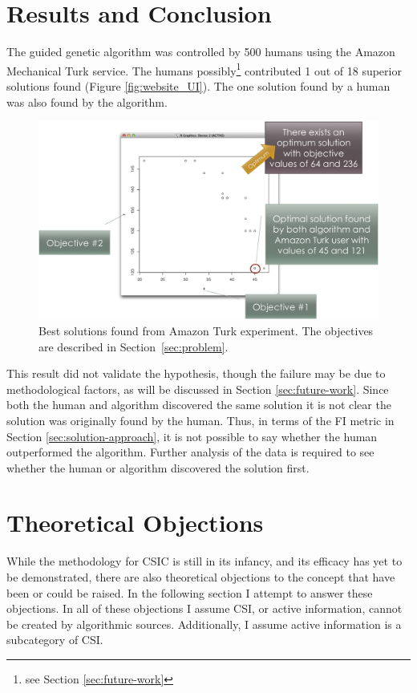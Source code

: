 \section{Results and Conclusion}
The guided genetic algorithm was controlled by 500 humans using the Amazon Mechanical Turk service.  The humans possibly\footnote{see Section \ref{sec:future-work}} contributed 1 out of 18 superior solutions found (Figure \ref{fig:website_UI}).  The one solution found by a human was also found by the algorithm.

\begin{figure}[!t]
  \centering
  \includegraphics[width=4.5in]{HollowayResults}
  \caption{Best solutions found from Amazon Turk experiment.  The objectives are described in Section~\ref{sec:problem}.}
  \label{fig:results}
\end{figure}

This result did not validate the hypothesis, though the failure may be due to methodological factors, as will be discussed in Section \ref{sec:future-work}.  Since both the human and algorithm discovered the same solution it is not clear the solution was originally found by the human.  Thus, in terms of the FI metric in Section \ref{sec:solution-approach}, it is not possible to say whether the human outperformed the algorithm.  Further analysis of the data is required to see whether the human or algorithm discovered the solution first.

\section{Theoretical Objections}\label{sec:objections}

While the methodology for CSIC is still in its infancy, and its efficacy has yet to be demonstrated, there are also theoretical objections to the concept that have been or could be raised.  In the following section I attempt to answer these objections.  In all of these objections I assume CSI, or active information, cannot be created by algorithmic sources.  Additionally, I assume active information is a subcategory of CSI.

